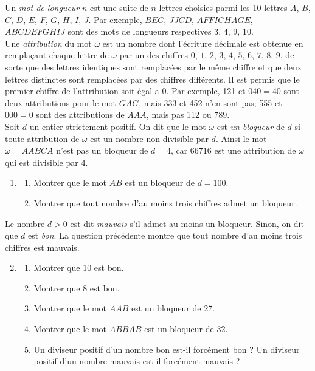 \documentclass[landscape,twocolumn,leqno,a4paper,10pt]{report} %
\newcommand\n{\noindent}
\begin{document}
\n Un \textit{mot de longueur} $n$ est une suite de $n$ lettres choisies parmi les 10 lettres $A$, $B$, $C$, $D$, $E$, $F$, $G$, $H$, $I$, $J$. Par exemple, $BEC$, $JJCD$, $AFFICHAGE$, $ABCDEFGHIJ$ sont des mots de longueurs respectives $3$, $4$, $9$, $10$.\\
Une \textit{attribution} du mot $\omega$ est un nombre dont l'écriture décimale est obtenue en remplaçant chaque lettre de $\omega$ par un des chiffres $0$, $1$, $2$, $3$, $4$, $5$, $6$, $7$, $8$, $9$, de sorte que des lettres identiques sont remplacées par le même chiffre et que deux lettres distinctes sont remplacées par des chiffres différents. Il est permis que le premier chiffre de l'attribution soit égal a 0. Par exemple, 121 et $040=40$ sont deux attributions pour le mot $GAG$, mais 333 et 452 n'en sont pas; 555 et $000=0$ sont des attributions de $A A A$, mais pas 112 ou $789$.\\
Soit $d$ un entier strictement positif. On dit que le mot $\omega$ est \textit{un bloqueur} de $d$ si toute attribution de $\omega$ est un nombre non divisible par $d$. Ainsi le mot $\omega=A A B C A$ n'est pas un bloqueur de $d=4$, car $66716$ est une attribution de $\omega$ qui est divisible par 4.

\begin{enumerate}
	\item \begin{enumerate}
		\item Montrer que le mot $A B$ est un bloqueur de $d=100$.
		\item Montrer que tout nombre d'au moins trois chiffres admet un bloqueur.
	\end{enumerate}
\end{enumerate}

\n Le nombre $d>0$ est dit \textit{mauvais} s'il admet au moins un bloqueur. Sinon, on dit que $d$ est \textit{bon}. La question précédente montre que tout nombre d'au moins trois chiffres est mauvais.

\begin{enumerate}\setcounter{enumi}{1}
	\item \begin{enumerate}
		\item Montrer que 10 est bon.
		\item Montrer que 8 est bon.
		\item Montrer que le mot $A A B$ est un bloqueur de 27.
		\item Montrer que le mot $A B B A B$ est un bloqueur de 32.
		\item Un diviseur positif d'un nombre bon est-il forcément bon ? Un diviseur positif d'un nombre mauvais est-il forcément mauvais ?
	\end{enumerate}
\end{enumerate}
\end{document}
